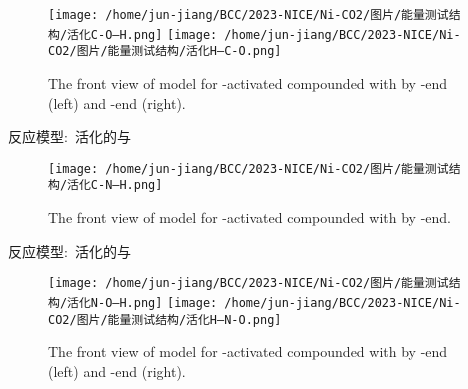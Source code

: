 \begin{frame}[allowframebreaks]
\begin{figure}[h!]
\centering
\texttt{[image: /home/jun-jiang/BCC/2023-NICE/Ni-CO2/图片/能量测试结构/活化C-O---H.png]}
\texttt{[image: /home/jun-jiang/BCC/2023-NICE/Ni-CO2/图片/能量测试结构/活化H---C-O.png]}
\caption{\tiny \textrm{The front view of model for -activated compounded with  by -end (left) and -end (right).}}%
\label{Model:CO-H}
\end{figure}
反应模型:~活化的\textrm{}与\textrm{}
\begin{figure}[h!]
\centering
\texttt{[image: /home/jun-jiang/BCC/2023-NICE/Ni-CO2/图片/能量测试结构/活化C-N---H.png]}
\caption{\tiny \textrm{The front view of model for -activated compounded with  by -end.}}%
\label{Model:CN-H}
\end{figure}
反应模型:~活化的\textrm{}与\textrm{}
\begin{figure}[h!]
\centering
\texttt{[image: /home/jun-jiang/BCC/2023-NICE/Ni-CO2/图片/能量测试结构/活化N-O---H.png]}
\texttt{[image: /home/jun-jiang/BCC/2023-NICE/Ni-CO2/图片/能量测试结构/活化H---N-O.png]}
\caption{\tiny \textrm{The front view of model for -activated compounded with  by -end (left) and -end (right).}}%
\label{Model:NO-H}
\end{figure}


\end{frame}
